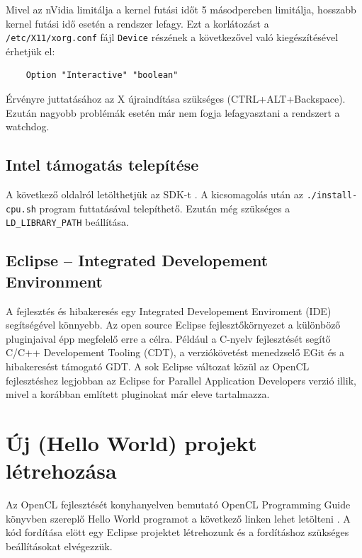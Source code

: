	Mivel az nVidia limitálja a kernel futási időt 5 másodpercben limitálja,
	hosszabb kernel futási idő esetén a rendszer lefagy.
	Ezt a korlátozást a \texttt{/etc/X11/xorg.conf} fájl \texttt{Device} részének a
	következővel való kiegészítésével érhetjük el:
	\begin{lstlisting}
	Option "Interactive" "boolean"
	\end{lstlisting}
	Érvényre juttatásához az X újraindítása szükséges (CTRL+ALT+Backspace).
	Ezután nagyobb problémák esetén már nem fogja lefagyasztani a rendszert a
	watchdog.

\subsection*{Intel támogatás telepítése}
	A következő oldalról letölthetjük az SDK-t \cite{intel-sdk}.
	A kicsomagolás után az \texttt{./install-cpu.sh} program futtatásával
	telepíthető.
	Ezután még szükséges a \texttt{LD\_LIBRARY\_PATH} beállítása.

\subsection*{Eclipse – Integrated Developement Environment}
	A fejlesztés és hibakeresés egy Integrated Developement Enviroment (IDE)
	segítségével könnyebb.
	Az open source Eclipse \cite{eclipse} fejlesztőkörnyezet a különböző pluginjaival épp
	megfelelő erre a célra.
	Például a C-nyelv fejlesztését segítő C/C++ Developement Tooling (CDT),
	a verziókövetést menedzselő EGit és a hibakeresést támogató GDT.
	A sok Eclipse változat közül az OpenCL fejlesztéshez legjobban az
	Eclipse for Parallel Application Developers verzió illik, mivel a korábban említett pluginokat már eleve tartalmazza.


\section*{Új (Hello World) projekt létrehozása}
	Az OpenCL fejlesztését konyhanyelven bemutató OpenCL Programming Guide \cite{Munshi2011}
	könyvben szereplő Hello World programot a következő linken lehet letölteni
	\cite{hellow}.
	A kód fordítása elött egy Eclipse projektet létrehozunk és a
	fordításhoz szükséges beállításokat elvégezzük.

